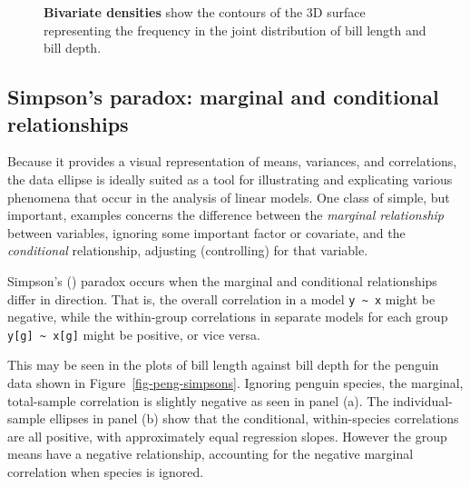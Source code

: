 \documentclass[
  letterpaper,
  10pt,
  krantz2]{krantz}
\begin{document}
\begin{figure}[H]


\caption{\label{fig-peng-ggdensity}\textbf{Bivariate densities} show the
contours of the 3D surface representing the frequency in the joint
distribution of bill length and bill depth.}

\end{figure}%

\subsection{Simpson's paradox: marginal and conditional
relationships}\label{simpsons-paradox-marginal-and-conditional-relationships}

Because it provides a visual representation of means, variances, and
correlations, the data ellipse is ideally suited as a tool for
illustrating and explicating various phenomena that occur in the
analysis of linear models. One class of simple, but important, examples
concerns the difference between the \emph{marginal relationship} between
variables, ignoring some important factor or covariate, and the
\emph{conditional} relationship, adjusting (controlling) for that
variable.

Simpson's () paradox occurs when the
marginal and conditional relationships differ in direction. That is, the
overall correlation in a model \texttt{y\ \textasciitilde{}\ x} might be
negative, while the within-group correlations in separate models for
each group \texttt{y{[}g{]}\ \textasciitilde{}\ x{[}g{]}} might be
positive, or vice versa.

This may be seen in the plots of bill length against bill depth for the
penguin data shown in Figure~\ref{fig-peng-simpsons}. Ignoring penguin
species, the marginal, total-sample correlation is slightly negative as
seen in panel (a). The individual-sample ellipses in panel (b) show that
the conditional, within-species correlations are all positive, with
approximately equal regression slopes. However the group means have a
negative relationship, accounting for the negative marginal correlation
when species is ignored.
\end{document}
